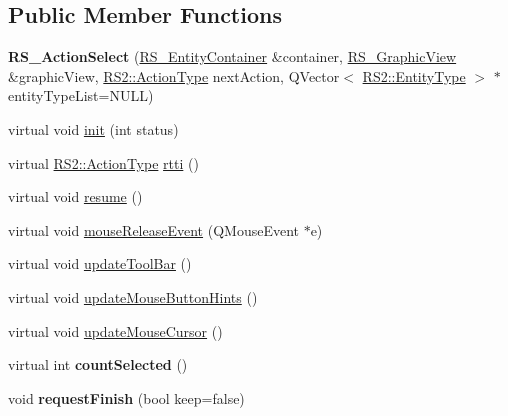 \subsection*{Public Member Functions}
\begin{DoxyCompactItemize}
\item 
\hypertarget{classRS__ActionSelect_a777c9184e94645d9128c6972d1953607}{{\bfseries R\-S\-\_\-\-Action\-Select} (\hyperlink{classRS__EntityContainer}{R\-S\-\_\-\-Entity\-Container} \&container, \hyperlink{classRS__GraphicView}{R\-S\-\_\-\-Graphic\-View} \&graphic\-View, \hyperlink{classRS2_afe3523e0bc41fd637b892321cfc4b9d7}{R\-S2\-::\-Action\-Type} next\-Action, Q\-Vector$<$ \hyperlink{classRS2_a8f26d1b981e1e85cff16738b43337e6a}{R\-S2\-::\-Entity\-Type} $>$ $\ast$entity\-Type\-List=N\-U\-L\-L)}\label{classRS__ActionSelect_a777c9184e94645d9128c6972d1953607}

\item 
virtual void \hyperlink{classRS__ActionSelect_ab004e10d3e984a7a47d6e2a2ed0c107d}{init} (int status)
\item 
virtual \hyperlink{classRS2_afe3523e0bc41fd637b892321cfc4b9d7}{R\-S2\-::\-Action\-Type} \hyperlink{classRS__ActionSelect_a5a8b63fc87512118e689c32046608bcb}{rtti} ()
\item 
virtual void \hyperlink{classRS__ActionSelect_af856db4089ce4a9690fce96910317621}{resume} ()
\item 
virtual void \hyperlink{classRS__ActionSelect_afa0fddd7cdb7025a7a9d924668b46e87}{mouse\-Release\-Event} (Q\-Mouse\-Event $\ast$e)
\item 
virtual void \hyperlink{classRS__ActionSelect_aac480d95839fec6e876fa3276006490a}{update\-Tool\-Bar} ()
\item 
virtual void \hyperlink{classRS__ActionSelect_ac569a055424e3402c9e2ef1702d07bcb}{update\-Mouse\-Button\-Hints} ()
\item 
virtual void \hyperlink{classRS__ActionSelect_aba8cb76d2946712cfca32fec591512c1}{update\-Mouse\-Cursor} ()
\item 
\hypertarget{classRS__ActionSelect_aed8fb54dc95135f9cfd1e0ad665371a9}{virtual int {\bfseries count\-Selected} ()}\label{classRS__ActionSelect_aed8fb54dc95135f9cfd1e0ad665371a9}

\item 
\hypertarget{classRS__ActionSelect_a1afee1e6f7584520d62802af91391246}{void {\bfseries request\-Finish} (bool keep=false)}\label{classRS__ActionSelect_a1afee1e6f7584520d62802af91391246}

\end{DoxyCompactItemize}
